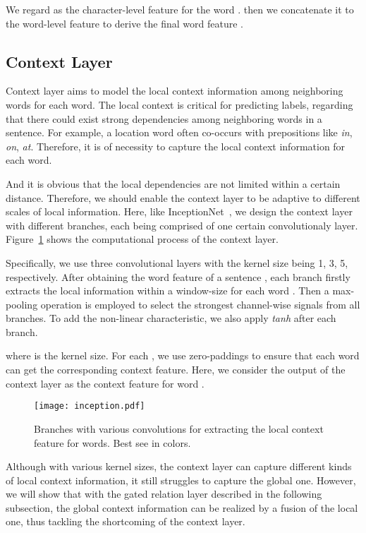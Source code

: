 \documentclass[letterpaper]{article} \usepackage{aaai19}  \usepackage{times}  \usepackage{helvet}  \usepackage{courier}  \usepackage{url}  \usepackage{graphicx}  \usepackage{amsmath}
\begin{document}
We regard  as the character-level feature for the word . then we concatenate it to the word-level feature  to derive the final word feature .

\subsection{Context Layer}
Context layer aims to model the local context information among neighboring words for each word. The local context is critical for predicting labels, regarding that there could exist strong dependencies among neighboring words in a sentence. For example, a location word often co-occurs with prepositions like \textit{in}, \textit{on}, \textit{at}. Therefore, it is of necessity to capture the local context information for each word.

And it is obvious that the local dependencies are not limited within a certain distance. Therefore, we should enable the context layer to be adaptive to different scales of local information. Here, like InceptionNet~\cite{szegedy2015going}, we design the context layer with different branches, each being comprised of one certain convolutionaly layer. Figure~\ref{fig:inception} shows the computational process of the context layer.

Specifically, we use three convolutional layers with the kernel size being 1, 3, 5, respectively. After obtaining the word feature  of a sentence , each branch firstly extracts the local information  within a window-size  for each word . Then a max-pooling operation is employed to select the strongest channel-wise signals from all branches. To add the non-linear characteristic, we also apply \textit{tanh} after each branch.


where  is the kernel size. For each , we use  zero-paddings to ensure that each word can get the corresponding context feature. Here, we consider the output  of the context layer as the context feature for word .

\begin{figure}[!t] \centering
  \texttt{[image: inception.pdf]}
  \caption{Branches with various convolutions for extracting the local context feature for words. Best see in colors.}
  \label{fig:inception}
\end{figure}

Although with various kernel sizes, the context layer can capture different kinds of local context information, it still struggles to capture the global one. However, we will show that with the gated relation layer described in the following subsection, the global context information can be realized by a fusion of the local one, thus tackling the shortcoming of the context layer.
\end{document}
